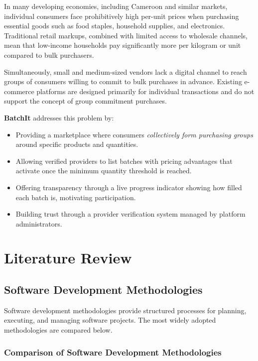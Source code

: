 \documentclass[12pt, a4paper]{report}
\begin{document}
In many developing economies, including Cameroon and similar markets, individual consumers face prohibitively high per-unit prices when purchasing essential goods such as food staples, household supplies, and electronics. Traditional retail markups, combined with limited access to wholesale channels, mean that low-income households pay significantly more per kilogram or unit compared to bulk purchasers.

Simultaneously, small and medium-sized vendors lack a digital channel to reach groups of consumers willing to commit to bulk purchases in advance. Existing e-commerce platforms are designed primarily for individual transactions and do not support the concept of group commitment purchases.

\textbf{BatchIt} addresses this problem by:
\begin{itemize}[leftmargin=*]
  \item Providing a marketplace where consumers \textit{collectively form purchasing groups} around specific products and quantities.
  \item Allowing verified providers to list batches with pricing advantages that activate once the minimum quantity threshold is reached.
  \item Offering transparency through a live progress indicator showing how filled each batch is, motivating participation.
  \item Building trust through a provider verification system managed by platform administrators.
\end{itemize}

\chapter{Literature Review}

\section{Software Development Methodologies}

Software development methodologies provide structured processes for planning, executing, and managing software projects. The most widely adopted methodologies are compared below.

\subsection{Comparison of Software Development Methodologies}
\end{document}

